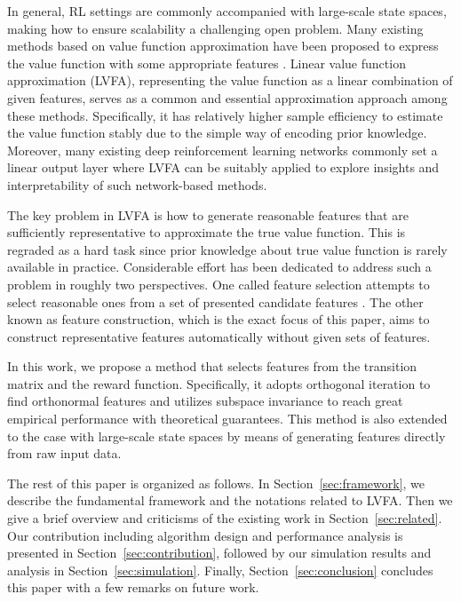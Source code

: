 \documentclass[onecolumn, conference]{IEEEtran}
\begin{document}
	In general, RL settings are commonly accompanied with large-scale state spaces, making how to ensure scalability a challenging open problem. Many existing methods based on value function approximation have been proposed to express the value function with some appropriate features \cite{Sutton2005ReinforcementLA, Szepesvari2010AlgorithmsFR, Wang2020OnRR}. Linear value function approximation (LVFA), representing the value function as a linear combination of given features, serves as a common and essential approximation approach among these methods. Specifically, it has relatively higher sample efficiency to  estimate the value function stably due to the simple way of encoding prior knowledge. Moreover, many existing deep reinforcement learning networks \cite{Mnih2013PlayingAW, Silver2017MasteringTG, Lillicrap2016ContinuousCW, ShalevShwartz2016SafeMR} commonly set a linear output layer where LVFA can be suitably applied to explore insights and interpretability of such network-based methods. 
		
	The key problem in LVFA is how to generate reasonable features that are sufficiently representative to approximate the true value function. This is regraded as a hard task since prior knowledge about true value function is rarely available in practice. Considerable effort has been dedicated to address such a problem in roughly two perspectives. One called  feature selection attempts to select reasonable ones from a set of presented candidate features \cite{Bradtke2004LinearLA, Sutton2005LearningTP, Geramifard2006IncrementalLT, Kolter2009RegularizationAF, Johns2010LinearCF, Petrik2010FeatureSU}. The other known as feature construction, which is the exact focus of this paper, aims to construct representative features automatically without given sets of features\cite{Parr2008AnAO,Petrik2007AnAO ,Parr2007AnalyzingFG,Song2016LinearFE,Behzadian2019FeatureSB}. 
	
	In this work, we propose a method that selects features from the transition matrix and the reward function. Specifically, it adopts orthogonal iteration to find orthonormal features and utilizes subspace invariance to reach great empirical performance with theoretical guarantees. This method is also extended to the case with large-scale state spaces by means of generating features directly from raw input data.

The rest of this paper is organized as follows. In Section~\ref{sec:framework}, we describe the fundamental framework and the notations related to LVFA. Then we  give a brief overview and criticisms of the existing work in Section~\ref{sec:related}. Our contribution including algorithm design and performance analysis is presented in Section~\ref{sec:contribution}, followed by our simulation results and analysis in Section~\ref{sec:simulation}. Finally, Section~\ref{sec:conclusion} concludes this paper with a few remarks on future work.
\end{document}
